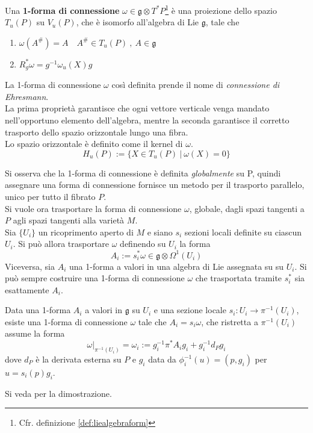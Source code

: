 \begin{definition}\label{def:connection1form}
   Una \textbf{1-forma di connessione} $\omega \in \mathfrak{g} \otimes T^*P$\footnote{
   Cfr. definizione \ref{def:liealgebraform}}
   è una proiezione dello spazio $T_u(P)$ su $V_u(P)$, che è isomorfo all'algebra
   di Lie $\mathfrak{g}$, tale che
   \begin{enumerate}
      \item $\omega(A^\#) = A   \quad A^\# \in T_u(P) \: ,  \: A \in \mathfrak{g}$
      \item $R_g^* \omega = g^{-1} \omega_u(X) g $ \\
   \end{enumerate}
\end{definition}
La 1-forma di connessione $\omega$ così definita prende il nome di \emph{connessione
di Ehresmann}.\\
La prima proprietà garantisce che ogni vettore verticale venga mandato nell'opportuno
elemento dell'algebra, mentre la seconda garantisce il corretto trasporto dello
spazio orizzontale lungo una fibra.\\
Lo spazio orizzontale è definito come il kernel di $\omega$.
$$
   H_u(P) := \{ X \in T_u(P) \: | \: \omega (X) = 0 \}
$$

Si osserva che la 1-forma di connessione è definita \emph{globalmente} su P, quindi
assegnare una forma di connessione fornisce un metodo per il trasporto parallelo,
unico per tutto il fibrato $P$.\\

Si vuole ora trasportare la forma di connessione $\omega$, globale, dagli spazi
tangenti a $P$ agli spazi tangenti alla varietà $M$.\\

Sia $\{U_i\}$ un ricoprimento aperto di $M$ e siano $s_i$ sezioni locali definite
su ciascun $U_i$. Si può allora trasportare $\omega$ definendo su $U_i$ la forma
$$
   A_i := s_i^* \omega \in \mathfrak{g} \otimes \Omega^1(U_i)
$$
Viceversa, sia $A_i$ una 1-forma a valori in una algebra di Lie assegnata su su $U_i$.
Si può sempre costruire una 1-forma di connessione $\omega$ che trasportata tramite
$s_i^*$ sia esattamente $A_i$.

\begin{theorem}\label{thm:gaugepotential}
   Data una 1-forma $A_i$ a valori in $\mathfrak{g}$ su $U_i$ e una sezione locale
   $s_i : U_i \to \pi^{-1}(U_i)$, esiste una 1-forma di connessione $\omega$
   tale che $A_i = s_i \omega$, che ristretta a $\pi^{-1}(U_i)$ assume la forma
   $$
      \omega|_{\pi^{-1}(U_i)} = \omega_i := g_i^{-1} \pi^* A_i g_i + g_i^{-1} d_P g_i
   $$
   dove $d_P$ è la derivata esterna su $P$ e $g_i$ data da $\phi_i^{-1}(u) = (p,g_i)$
   per $u = s_i(p)g_i$.
\end{theorem}
Si veda \cite{nakahara} per la dimostrazione.\\

